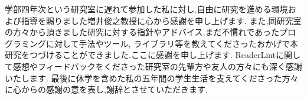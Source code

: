 \begin{acknowledgment}
    学部四年次という研究室に遅れて参加した私に対し,自由に研究を進める環境および指導を賜りました増井俊之教授に心から感謝を申し上げます.
    また,同研究室の方々から頂きました研究に対する指針やアドバイス,まだ不慣れであったプログラミングに対して手法やツール,
    ライブラリ等を教えてくださったおかげで本研究をつづけることができました.ここに感謝を申し上げます.
    ReaderLintに関して感想やフィードバックをくださった研究室の先輩方や友人の方々にも深く感謝いたします.
    最後に休学を含めた私の五年間の学生生活を支えてくださった方々に心からの感謝の意を表し,謝辞とさせていただきます.
\end{acknowledgment}

